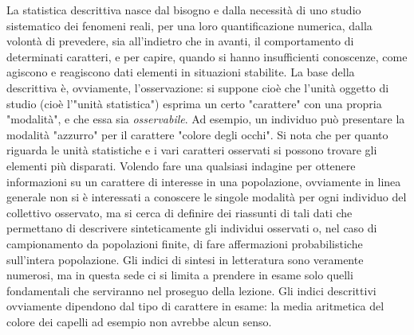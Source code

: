 \documentclass[a4paper]{article}
\begin{document}
La statistica descrittiva nasce dal bisogno e dalla necessit\`{a} di uno studio sistematico dei fenomeni reali, per una loro quantificazione numerica, dalla volont\`{a} di prevedere, sia all'indietro che in avanti, il comportamento di determinati caratteri, e per capire, quando si hanno insufficienti conoscenze, come agiscono e reagiscono dati elementi in situazioni stabilite.
La base della descrittiva \`{e}, ovviamente, l'osservazione: si suppone cio\`{e} che l'unit\`{a} oggetto di studio (cio\`{e} l'"unit\`{a} statistica") esprima un certo "carattere" con una propria "modalit\`{a}", e che essa sia \emph{osservabile}.
Ad esempio, un individuo può presentare la modalit\`{a} "azzurro" per il carattere "colore degli occhi". Si nota che per quanto riguarda le unit\`{a} statistiche e i vari caratteri osservati si possono trovare gli elementi più disparati.
Volendo fare una qualsiasi indagine per ottenere informazioni su un carattere di interesse in una popolazione, ovviamente in linea generale non si \`{e} interessati a conoscere le singole modalit\`{a} per ogni individuo del collettivo osservato, ma si cerca di definire dei riassunti di tali dati che permettano di descrivere sinteticamente gli individui osservati o, nel caso di campionamento da popolazioni finite, di fare affermazioni probabilistiche sull'intera popolazione.
Gli indici di sintesi in letteratura sono veramente numerosi, ma in questa sede ci si limita a prendere in esame solo quelli fondamentali che serviranno nel proseguo della lezione.
Gli indici descrittivi ovviamente dipendono dal tipo di carattere in esame: la media aritmetica del colore dei capelli ad esempio non avrebbe alcun senso.
\end{document}
